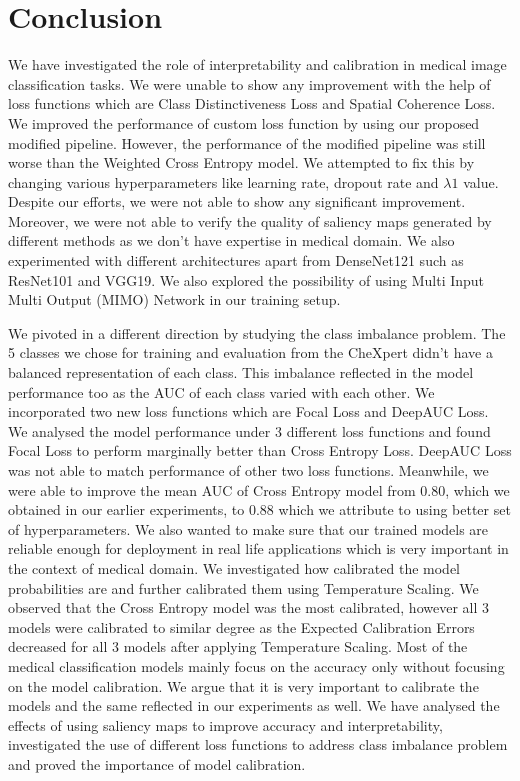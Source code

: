 \def\baselinestretch{1}
\chapter{Conclusion}
\ifpdf
    \graphicspath{{Conclusions/ConclusionsFigs/PNG/}{Conclusions/ConclusionsFigs/PDF/}{Conclusions/ConclusionsFigs/}}
\else
    \graphicspath{{Conclusions/ConclusionsFigs/EPS/}{Conclusions/ConclusionsFigs/}}
\fi

\def\baselinestretch{1.66}

We have investigated the role of interpretability and calibration in medical image classification tasks. We were unable to show any improvement with the help of loss functions which are Class Distinctiveness Loss and Spatial Coherence Loss. We improved the performance of custom loss function by using our proposed modified pipeline. However, the performance of the modified pipeline was still worse than the Weighted Cross Entropy model. We attempted to fix this by changing various hyperparameters like learning rate, dropout rate and $\lambda1$ value. Despite our efforts, we were not able to show any significant improvement. Moreover, we were not able to verify the quality of saliency maps generated by different methods as we don't have expertise in medical domain. We also experimented with different architectures apart from DenseNet121 such as ResNet101 and VGG19. We also explored the possibility of using Multi Input Multi Output (MIMO) Network in our training setup.

We pivoted in a different direction by studying the class imbalance problem. The 5 classes we chose for training and evaluation from the CheXpert didn't have a balanced representation of each class. This imbalance reflected in the model performance too as the AUC of each class varied with each other. We incorporated two new loss functions which are Focal Loss and DeepAUC Loss. We analysed the model performance under 3 different loss functions and found Focal Loss to perform marginally better than Cross Entropy Loss. DeepAUC Loss was not able to match performance of other two loss functions. Meanwhile, we were able to improve the mean AUC of Cross Entropy model from 0.80, which we obtained in our earlier experiments, to 0.88 which we attribute to using better set of hyperparameters. We also wanted to make sure that our trained models are reliable enough for deployment in real life applications which is very important in the context of medical domain. We investigated how calibrated the model probabilities are and further calibrated them using Temperature Scaling. We observed that the Cross Entropy model was the most calibrated, however all 3 models were calibrated to similar degree as the Expected Calibration Errors decreased for all 3 models after applying Temperature Scaling. Most of the medical classification models mainly focus on the accuracy only without focusing on the model calibration. We argue that it is very important to calibrate the models and the same reflected in our experiments as well. We have analysed the effects of using saliency maps to improve accuracy and interpretability, investigated the use of different loss functions to address class imbalance problem and proved the importance of model calibration.



